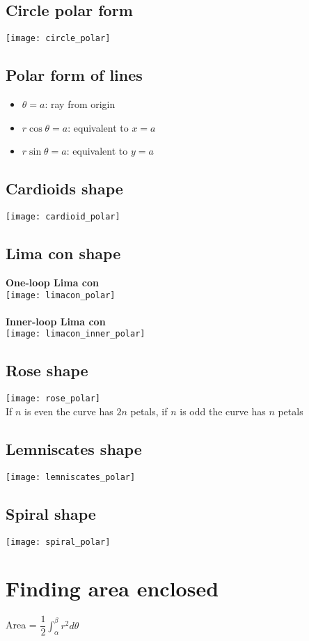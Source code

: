 \subsection{Circle polar form}
\texttt{[image: circle\_polar]}

\subsection{Polar form of lines}
\begin{itemize}
    \item $\theta=a$: ray from origin
    \item $r\cos\theta=a$: equivalent to $x=a$
    \item $r\sin\theta=a$: equivalent to $y=a$
\end{itemize}

\subsection{Cardioids shape}
\texttt{[image: cardioid\_polar]}
\subsection{Lima con shape}
\textbf{One-loop Lima con}\\
\texttt{[image: limacon\_polar]}\\ \\
\textbf{Inner-loop Lima con}\\
\texttt{[image: limacon\_inner\_polar]}
\subsection{Rose shape}
\texttt{[image: rose\_polar]}\\
If $n$ is even the curve has $2n$ petals, if $n$ is odd the curve has $n$ petals

\subsection{Lemniscates shape}
\texttt{[image: lemniscates\_polar]}

\subsection{Spiral shape}
\texttt{[image: spiral\_polar]}




\section{Finding area enclosed}
Area = $\dfrac{1}{2}\int_{\alpha}^{\beta} r^2d\theta$